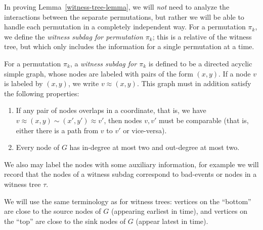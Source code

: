 In proving Lemma~\ref{witness-tree-lemma}, we will \emph{not} need to analyze the interactions between the separate permutations, but rather we will be able to handle each permutation in a completely independent way. For a permutation $\pi_k$, we define the \emph{witness subdag for permutation $\pi_k$}; this is a relative of the witness tree, but which only includes the information for a single permutation at a time.

\begin{definition}
For a permutation $\pi_k$, a \emph{witness subdag for $\pi_k$} is defined to be a directed acyclic simple graph, whose nodes are labeled with pairs of the form $(x,y)$. If a node $v$ is labeled by $(x,y)$, we write $v \approx (x,y)$. This graph must in addition satisfy the following properties:
\begin{enumerate}
\item If any pair of nodes overlaps in a coordinate, that is, we have $v \approx (x,y) \sim (x', y') \approx v'$, then nodes $v, v'$ must be comparable (that is, either there is a path from $v$ to $v'$ or vice-versa). 
\item Every node of $G$ has in-degree at most two and out-degree at most two.
\end{enumerate}

We also may label the nodes with some auxiliary information, for example we will record that the nodes of a witness subdag correspond to bad-events or nodes in a witness tree $\tau$.

We will use the same terminology as for witness trees: vertices on the ``bottom'' are close to the source nodes of $G$ (appearing earliest in time), and vertices on the ``top'' are close to the sink nodes of $G$ (appear latest in time).
\end{definition}

